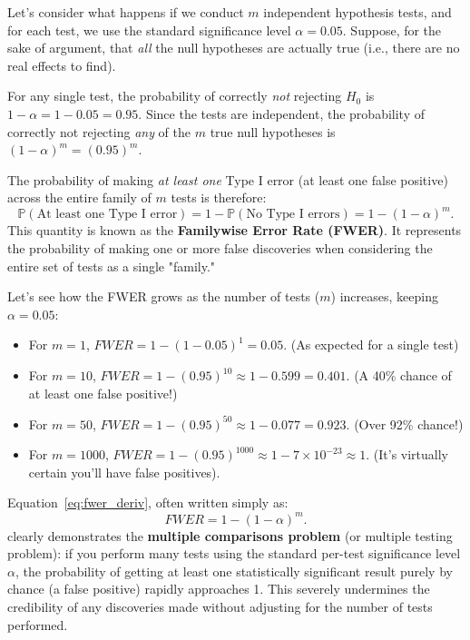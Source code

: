 \documentclass[12pt]{book}
\newcommand{\Prob}{\mathbb{P}}           %
\newcommand{\FWER}{{FWER}}  %
\newcommand{\Hnull}{H_0}                 %
\begin{document}
Let's consider what happens if we conduct $m$ independent hypothesis tests, and for each test, we use the standard significance level $\alpha = 0.05$. Suppose, for the sake of argument, that \emph{all} the null hypotheses are actually true (i.e., there are no real effects to find).

For any single test, the probability of correctly \emph{not} rejecting $\Hnull$ is $1 - \alpha = 1 - 0.05 = 0.95$.
Since the tests are independent, the probability of correctly not rejecting \emph{any} of the $m$ true null hypotheses is $(1 - \alpha)^m = (0.95)^m$.

The probability of making \emph{at least one} Type I error (at least one false positive) across the entire family of $m$ tests is therefore:
\begin{equation}
  \label{eq:fwer_deriv}
  \Prob(\text{At least one Type I error}) = 1 - \Prob(\text{No Type I errors}) = 1 - (1-\alpha)^{m}.
\end{equation}
This quantity is known as the \textbf{Familywise Error Rate (FWER)}. It represents the probability of making one or more false discoveries when considering the entire set of tests as a single "family."

Let's see how the FWER grows as the number of tests ($m$) increases, keeping $\alpha = 0.05$:
\begin{itemize}
    \item For $m=1$, $\FWER = 1 - (1-0.05)^1 = 0.05$. (As expected for a single test)
    \item For $m=10$, $\FWER = 1 - (0.95)^{10} \approx 1 - 0.599 = 0.401$. (A 40\% chance of at least one false positive!)
    \item For $m=50$, $\FWER = 1 - (0.95)^{50} \approx 1 - 0.077 = 0.923$. (Over 92\% chance!)
    \item For $m=1000$, $\FWER = 1 - (0.95)^{1000} \approx 1 - 7 \times 10^{-23} \approx 1$. (It's virtually certain you'll have false positives).
\end{itemize}

Equation~\eqref{eq:fwer_deriv}, often written simply as:
\begin{equation}
  \label{eq:fwer}
  \FWER = 1 - (1-\alpha)^{m}.
\end{equation}
clearly demonstrates the \textbf{multiple comparisons problem} (or multiple testing problem): if you perform many tests using the standard per-test significance level $\alpha$, the probability of getting at least one statistically significant result purely by chance (a false positive) rapidly approaches 1. This severely undermines the credibility of any discoveries made without adjusting for the number of tests performed.
\end{document}
